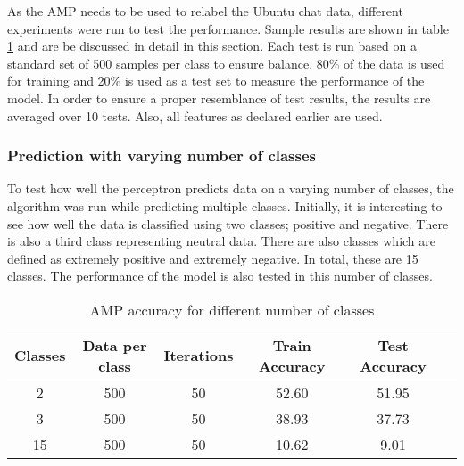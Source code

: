 
\begin{comment}
Experiments / Empirical evaluation (roughly 2-3 pages)
• Any details about experiments (dataset sizes, parameter selection, etc)
• Results
• Analysis (discussion of results / visualization / findings / etc)
\end{comment}

As the AMP needs to be used to relabel the Ubuntu chat data, different experiments were run to test the performance. Sample results are shown in table \ref{table:AMPaccuracy} and are be discussed in detail in this section. Each test is run based on a standard set of 500 samples per class to ensure balance. 80\% of the data is used for training and 20\% is used as a test set to measure the performance of the model. In order to ensure a proper resemblance of test results, the results are averaged over 10 tests. Also, all features as declared earlier are used.

\subsubsection{Prediction with varying number of classes}
To test how well the perceptron predicts data on a varying number of classes, the algorithm was run while predicting multiple classes. Initially, it is interesting to see how well the data is classified using two classes; positive and negative. There is also a third class representing neutral data. There are also classes which are defined as extremely positive and extremely negative. In total, these are 15 classes. The performance of the model is also tested in this number of classes. 

\begin{table}[h!]
\begin{center}
\begin{tabular}{| c | c | c | c | c | c |}
\hline
 {\textbf{Classes}} 	 
 & {\textbf{Data per class}} 					& {\textbf{Iterations}} 
 & {\textbf{Train Accuracy}} 					& {\textbf{Test Accuracy}} 
 \\
\hline
2	&	500	&	50	&	52.60	& 	51.95	\\
3	&	500	&	50	&	38.93	&	37.73	\\
15	&	500	&	50	&	10.62	&	9.01		\\
\hline
\end{tabular}
\caption{AMP accuracy for different number of classes }
\label{table:AMPaccuracy}
\end{center}
\end{table}


